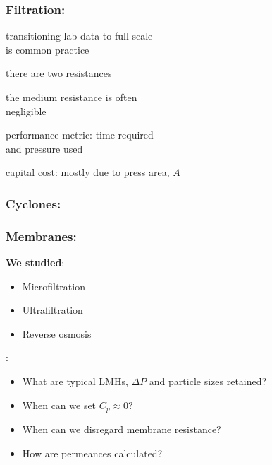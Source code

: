 {
\begin{frame}\frametitle{Filtration: {}}
	\begin{itemize}
		{\color{myGreen}
		\item	transitioning lab data to full scale\\ is common practice
		\item	there are two resistances
		\item	the medium resistance is often\\ negligible
		\item	performance metric: time required\\ and pressure used
		\item	capital cost: mostly due to press area, $A$
		}
	\end{itemize}
\end{frame}}


{
\begin{frame}\frametitle{Cyclones: {}}
\end{frame}}

{
\begin{frame}\frametitle{Membranes: {}}
	\textbf{We studied}:
	\begin{itemize}
		\item	Microfiltration
		\item	Ultrafiltration
		\item	Reverse osmosis
	\end{itemize}
	
	\vspace{3cm}
	\emph{{\color{myGreen}{Some things to consider}}}:
	\begin{itemize}
		\item	What are typical LMHs, $\Delta P$ and particle sizes retained?
		\item	When can we set $C_p \approx 0$?
		\item	When can we disregard membrane resistance?
		\item	How are permeances calculated?
	\end{itemize}
\end{frame}}

